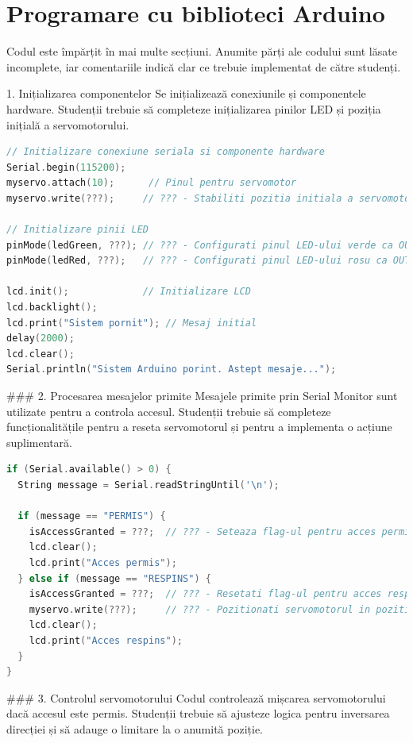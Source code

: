 \documentclass{report}
\begin{document}
\section{Programare cu biblioteci Arduino}

Codul este împărțit în mai multe secțiuni. Anumite părți ale codului sunt lăsate incomplete, iar comentariile indică clar ce trebuie implementat de către studenți.

1. Inițializarea componentelor
Se inițializează conexiunile și componentele hardware. Studenții trebuie să completeze inițializarea pinilor LED și poziția inițială a servomotorului.
\newpage
\vspace*{1cm}
\begin{lstlisting}[language=C++]
// Initializare conexiune seriala si componente hardware
Serial.begin(115200);
myservo.attach(10);      // Pinul pentru servomotor
myservo.write(???);     // ??? - Stabiliti pozitia initiala a servomotorului (0-180°)

// Initializare pinii LED
pinMode(ledGreen, ???); // ??? - Configurati pinul LED-ului verde ca OUTPUT
pinMode(ledRed, ???);   // ??? - Configurati pinul LED-ului rosu ca OUTPUT

lcd.init();             // Initializare LCD
lcd.backlight();
lcd.print("Sistem pornit"); // Mesaj initial
delay(2000); 
lcd.clear();
Serial.println("Sistem Arduino porint. Astept mesaje...");
\end{lstlisting}

### 2. Procesarea mesajelor primite
Mesajele primite prin Serial Monitor sunt utilizate pentru a controla accesul. Studenții trebuie să completeze funcționalitățile pentru a reseta servomotorul și pentru a implementa o acțiune suplimentară.

\begin{lstlisting}[language=C++]
if (Serial.available() > 0) {
  String message = Serial.readStringUntil('\n');

  if (message == "PERMIS") {
    isAccessGranted = ???;  // ??? - Seteaza flag-ul pentru acces permis
    lcd.clear();
    lcd.print("Acces permis");
  } else if (message == "RESPINS") {
    isAccessGranted = ???;  // ??? - Resetati flag-ul pentru acces respins
    myservo.write(???);     // ??? - Pozitionati servomotorul in pozitia de start
    lcd.clear();
    lcd.print("Acces respins");
  }
}
\end{lstlisting}

\vspace*{1cm}
### 3. Controlul servomotorului
Codul controlează mișcarea servomotorului dacă accesul este permis. Studenții trebuie să ajusteze logica pentru inversarea direcției și să adauge o limitare la o anumită poziție.
\end{document}
